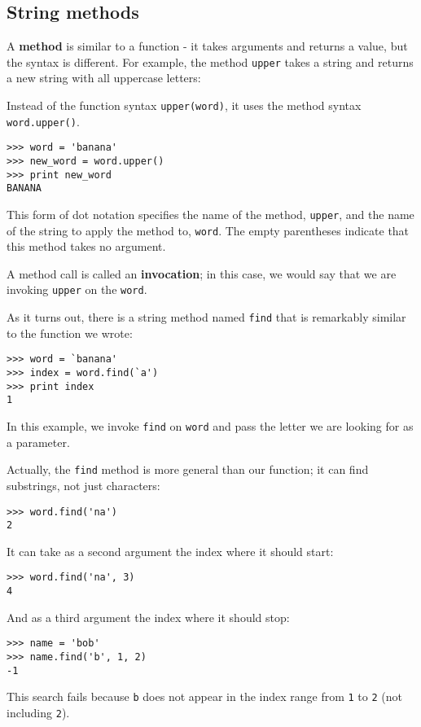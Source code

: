 \documentclass{article}
\begin{document}
\subsection{String methods}
A \textbf{method} is similar to a function - it takes arguments and returns a
value, but the syntax is different. For example, the method
\verb|upper|
takes a string and returns a new string with all uppercase letters:
\par Instead of the function syntax \verb|upper(word)|,
it uses the method syntax \verb|word.upper()|.
\begin{verbatim}
>>> word = 'banana'
>>> new_word = word.upper()
>>> print new_word
BANANA
\end{verbatim}
\par This form of dot notation specifies the name of the method,
\verb|upper|, and the name of the string to apply the method to,
\verb|word|. The empty
parentheses indicate that this method takes no argument.
\par A method call is called an \textbf{invocation};
in this case, we would say that
we are invoking \verb|upper| on the \verb|word|.
\par As it turns out, there is a string method named \verb|find| that is
remarkably similar to the function we wrote:
\begin{verbatim}
>>> word = `banana'
>>> index = word.find(`a')
>>> print index
1
\end{verbatim}
\par In this example, we invoke \verb|find| on \verb|word|
and pass the letter we are looking for as a parameter.
\par Actually, the \verb|find| method is more general than our function; it can
find substrings, not just characters:
\begin{verbatim}
>>> word.find('na')
2
\end{verbatim}
\par It can take as a second argument the index where it should start:
\begin{verbatim}
>>> word.find('na', 3)
4
\end{verbatim}
\par And as a third argument the index where it should stop:
\begin{verbatim}
>>> name = 'bob'
>>> name.find('b', 1, 2)
-1
\end{verbatim}
\par This search fails because \verb|b| does not appear in the index range from
\verb|1| to \verb|2| (not including \verb|2|).
\end{document}
